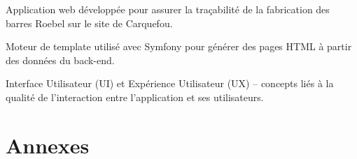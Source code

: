 \documentclass[11pt,a4paper]{article}
\begin{document}
\begin{description}[leftmargin=2cm,labelindent=0cm]
\item[TraQbar :] Application web développée pour assurer la traçabilité de la fabrication des barres Roebel sur le site de Carquefou.

\item[Twig :] Moteur de template utilisé avec Symfony pour générer des pages HTML à partir des données du back-end.

\item[UI / UX :] Interface Utilisateur (UI) et Expérience Utilisateur (UX) – concepts liés à la qualité de l’interaction entre l’application et ses utilisateurs.

\end{description}

\newpage
\section*{Annexes}
\end{document}
